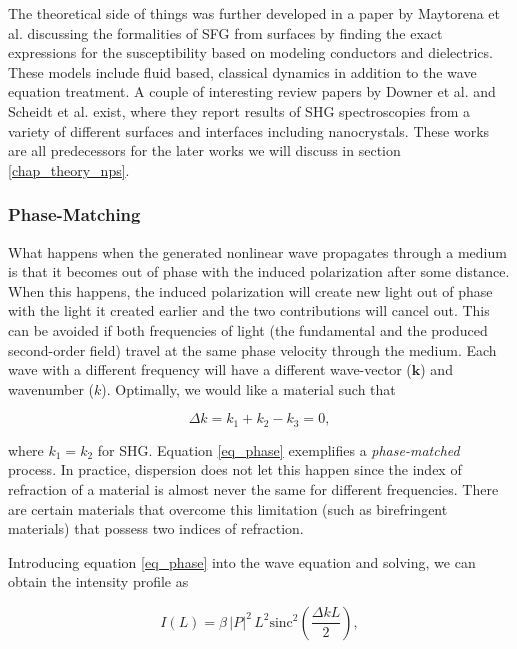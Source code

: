 The theoretical side of things was further developed in a paper by Maytorena et al. \cite{PhysRevB.57.2569} discussing the formalities of SFG from surfaces by finding the exact expressions for the susceptibility based on modeling conductors and dielectrics. These models include fluid based, classical dynamics in addition to the wave equation treatment. A couple of interesting review papers by Downer et al. \cite{downer2001optical} and Scheidt et al. \cite{scheidt2004optical} exist, where they report results of SHG spectroscopies from a variety of different surfaces and interfaces including nanocrystals. These works are all predecessors for the later works we will discuss in section \ref{chap_theory_nps}.

\subsubsection{Phase-Matching}
What happens when the generated nonlinear wave propagates through a medium is that it becomes out of phase with the induced polarization after some distance. When this happens, the induced polarization will create new light out of phase with the light it created earlier and the two contributions will cancel out. This can be avoided if both frequencies of light (the fundamental and the produced second-order field) travel at the same phase velocity through the medium. Each wave with a different frequency will have a different wave-vector ($\mathbf{k}$) and wavenumber ($k$). Optimally, we would like a material such that

\begin{equation}
\Delta k = k_{1} + k_{2} - k_{3} = 0,\label{eq_phase}
\end{equation}

where $k_{1} = k_{2}$ for SHG. Equation \eqref{eq_phase} exemplifies a \emph{phase-matched} process. In practice, dispersion does not let this happen since the index of refraction of a material is almost never the same for different frequencies. There are certain materials that overcome this limitation (such as birefringent materials) that possess two indices of refraction.

Introducing equation \eqref{eq_phase} into the wave equation and solving, we can obtain the intensity profile \cite{boyd2003nonlinear} as

\begin{equation}
I(L) = \beta\,\vert P\vert^{2}\,L^{2}\text{sinc}^{2}\left(\frac{\Delta k L}{2}\right),
\end{equation}

